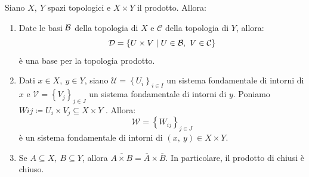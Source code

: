 \begin{proposition}
	Siano $X,\ Y$ spazi topologici e $X\times Y$ il prodotto. Allora:
	\begin{enumerate}
		\item Date le basi $\mathcal{B}$ della topologia di $X$ e $\mathcal{C}$ della topologia di $Y$, allora:
		\begin{equation}
			\mathcal{D}=\left\{U\times V\mid U\in\mathcal{B},\ V\in\mathcal{C}\right\}
		\end{equation}
		è una base per la topologia prodotto.
		\item Dati $x\in X,\ y\in Y$, siano $\mathcal{U} = \left\{U_i\right\}_{i\in I}$ un
		sistema fondamentale di intorni di $x$ e $\mathcal{V} = \left\{V_j\right\}_{j\in J}$ un sistema fondamentale di intorni di $y$. Poniamo $Wij \coloneqq U_i \times V_j \subseteq X \times Y$ . Allora:
		\begin{equation}
			\mathcal{W} = \left\{W_{ij}\right\}_{j\in J}
		\end{equation}
		è un sistema fondamentale di intorni di $\left(x,\ y\right) \in X \times Y$.
		\item Se $A\subseteq X,\ B\subseteq Y$, allora $\overline{A\times B}=\overline{A}\times \overline{B}$. In particolare, il prodotto di chiusi è chiuso.
	\end{enumerate}
\end{proposition}
